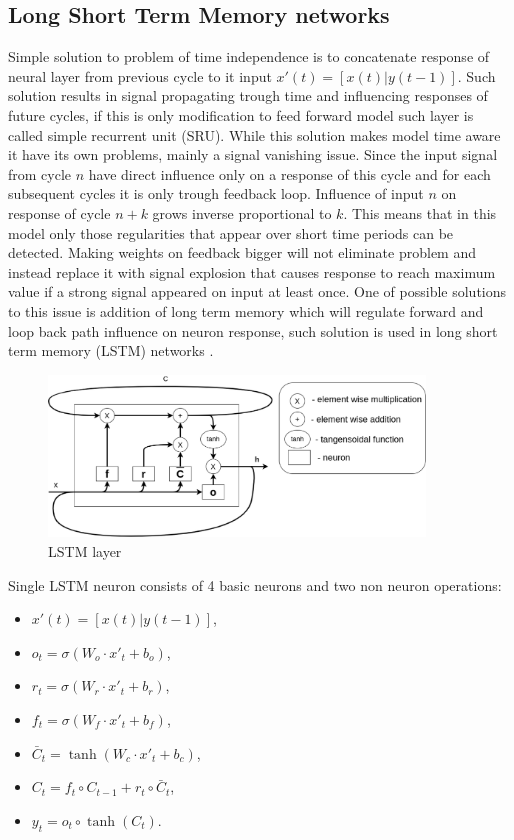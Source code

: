 \documentclass{kybernetika}
\begin{document}
\subsection{Long Short Term Memory networks}
Simple solution to problem of time independence is to concatenate response of neural layer
from previous cycle to it input $x'(t)=[x(t)|y(t-1)]$.
Such solution results in signal propagating trough time and influencing responses of future cycles,
if this is only modification to feed forward model such layer is called simple recurrent
unit (SRU).
While this solution makes model time aware it have its own problems, mainly a signal vanishing
issue. Since the input signal from cycle $n$ have direct influence only on a response of this
cycle and for each subsequent cycles it is only trough feedback loop. Influence of input $n$ on
response of cycle $n+k$ grows inverse proportional to $k$.
This means that in this model only those regularities that appear over short time periods can
be detected.
Making weights on feedback bigger will not eliminate problem and instead replace it with signal
explosion that causes response to reach maximum value if a strong signal appeared on input at
least once.
One of possible solutions to this issue is addition of long term memory which will regulate
forward and loop back path influence on neuron response, such solution is used in long short
term memory (LSTM) networks \cite{Hochreiter1997}.
\begin{figure}[ht] 
\centering
	\includegraphics[width=10cm]{figures/lstm}
\caption{LSTM layer}
\label{fig:lstm}
\end{figure}
Single LSTM neuron consists of 4 basic neurons and two non neuron operations:
\begin{itemize}
\item $x'(t)=[x(t)|y(t-1)]$,
\item $o_t=\sigma (W_o\cdot x'_t+b_o)$,
\item $r_t=\sigma (W_r\cdot x'_t+b_r)$,
\item $f_t=\sigma (W_f\cdot x'_t+b_f)$,
\item $\bar{C}_t=\tanh (W_c\cdot x'_t+b_c)$,
\item $C_t=f_t\circ C_{t-1}+r_t\circ \bar{C}_t$,
\item $y_t=o_t\circ \tanh (C_t)$.
\end{itemize}
\end{document}
